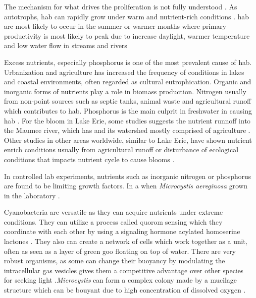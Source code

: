The mechanism for what drives the proliferation is not fully understood \cite{dittmann_cyanobacterial_2012}. As autotrophs, \gls{hab} can rapidly grow under warm and nutrient-rich conditions \cite{rastogi_cyanotoxin-microcystins:_2014}. \gls{hab} are most likely to occur in the summer or warmer months where primary productivity is most likely to peak due to increase daylight, warmer temperature and low water flow in streams and rivers \cite{vannote_river_1980,chapra_climate_2017-2}


Excess nutrients, especially phosphorus is one of the most prevalent cause of \gls{hab}. %
Urbanization and agriculture has increased the frequency of  conditions in lakes and coastal environments, often regarded as cultural eutrophication\cite{smith_eutrophication_2009}.
Organic and inorganic forms of nutrients  play a role in biomass production. Nitrogen usually from non-point sources such as septic tanks, animal waste and agricultural runoff which contributes to \gls{hab}. Phosphorus is the main culprit in freshwater in causing \gls{hab} \cite{anderson_harmful_2002}. For the bloom in Lake Erie,
some studies suggests the nutrient runnoff into the  Maumee river, which has and its watershed mostly comprised of agriculture \cite{michalak_record-setting_2013, chaffin_accuracy_2018}. Other studies in other areas worldwide, similar to Lake Erie, have shown nutrient enrich conditions usually from agricultural runoff or disturbance of ecological conditions that impacts nutrient cycle to cause blooms \cite{ahn_evaluation_2011, ahn_rainfall_2002, anderson_harmful_2002, jiang_statistical_2008}.

In controlled lab experiments, nutrients such as inorganic nitrogen or phosphorus are found to be limiting growth factors. In a  when \emph{Microcystis aereginosa} grown in the laboratory \cite{xiao_colony_2018, yema_role_2016}.

Cyanobacteria are versatile as they can acquire nutrients under extreme conditions. They can utilize a process called quorom sensing which they coordinate with each other by using a signaling hormone acylated homoserine lactones \cite{van_mooy_quorum_2012}.
They also can create a network of cells which work together as a unit, often as seen as a layer of green goo floating on top of water.  There are very robust organisms, as some can change their buoyancy by modulating the intracellular gas vesicles gives them a competitive advantage over other species for seeking light \cite{feng_how_2018}.\emph{Microcystis} can form a complex colony made by a mucilage structure which can be bouyant due to high concentration of dissolved oxygen \cite{xiao_colony_2018}. %


